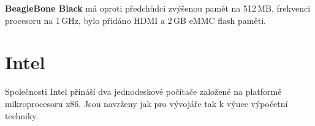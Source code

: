\textbf{BeagleBone Black} má oproti předchůdci zvýšenou pamět na 512\,MB, frekvenci procesoru na 1\,GHz, bylo přidáno HDMI a 2\,GB eMMC flash paměti.


\section{Intel}
\label{KapIntel}

Společnosti Intel přináší dva jednodeskové počítače založené na platformě mikroprocesoru x86. Jsou navrženy jak pro vývojáře tak k výuce výpočetní techniky.

